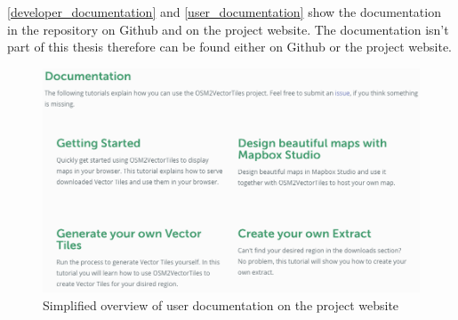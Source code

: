 \autoref{developer_documentation} and \autoref{user_documentation} show the documentation in the repository on Github and on the project website. The documentation isn't part of this thesis therefore can be found either on Github or the project website.

\begin{figure}[H]
  \centering
  \includegraphics[width=1.0\textwidth]{images/documentation/user_documentation}
  \caption{Simplified overview of user documentation on the project website}
  \label{user_documentation}
\end{figure}
